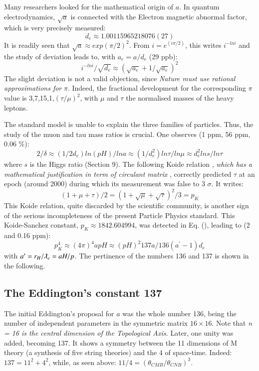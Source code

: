 \documentclass[twoside,draft]{article}
\begin{document}
\begin{sloppypar}
Many researchers looked for the mathematical origin of $a$. In quantum electrodynamics, $\sqrt{a}$ is connected with the Electron magnetic abnormal factor, which is very precisely measured\cite{Tanabashi}: $$d_e \approx 1.00115965218076(27)$$
It is readily seen that $\sqrt{a} \approx exp(\pi /2)^2$. From $i = e^{(i\pi /2)}$, this writes $i^{-lni}$ and the study of deviation leads to, with $a_e = a/d_e$ (29 ppb):
\begin{equation}
i^{-lni}/\sqrt{d_e} \approx (\sqrt{a_e} + 1/\sqrt{a_e})^2    
\end{equation}
The slight deviation is not a valid objection, since \textit{Nature must use rational approximations for} $\pi$. Indeed, the fractional development for the corresponding $\pi$ value is 3,7,15,1,$(\tau/\mu)^2$, with $\mu$ and $\tau$ the normalised masses of the heavy leptons.

The standard model is unable to explain the three families of particles. Thus, the study of the muon and tau mass ratios is crucial. One observes (1 ppm, 56 ppm, 0.06 \%):
\begin{equation}
2/\delta \approx (1/2d_{e}) ln(pH)/lna \approx (1/d_e^{2})ln\tau/ln\mu\approx d_e^2 lns/ln\tau
\end{equation}
where $s$ is the Higgs ratio (Section 9).
The following Koide relation \cite{Koide}, \textit{ which has a mathematical justification in term of circulant matrix} \cite{Brannen}, correctly predicted $\tau$ at an epoch (around 2000) during which its measurement was false to 3 $\sigma$. It writes:
\begin{equation}
(1 + \mu + \tau)/2 = (1 + \sqrt\mu + \sqrt\tau)^2/3 = p_K
\end{equation}
This Koide relation, quite discarded by the scientific community, is another sign of the serious incompleteness of the present Particle Physics standard.
This Koide-Sanchez constant, $p_K \approx 1842.604994$, was detected in Eq. (), leading to (2 and 0.16 ppm):
\begin{equation}
p_K^4 \approx (4\pi)^4 apH \approx (pH)^2 137a/136(a^{\prime}-1) d_e
\end{equation}
with $a^{\prime} = r_H/\lambdabar_e = aH/p$. The pertinence of the numbers 136 and 137 is shown in the following.


\subsection{The Eddington's constant 137}

The initial Eddington's proposal for $a$ was the whole number 136, being the number of independent parameters in the symmetric matrix $16 \times 16$. Note that \textit{n = 16 is the central dimension of the Topological Axis}. Later, one unity was added, becoming 137\cite{Eddington}. It shows a symmetry between the 11 dimensions of M theory (a synthesis of five string theories) and the 4 of space-time. Indeed: $137 = 11^{2} + 4^{2}$, while, as seen above: $11/4 = (\theta_{CMB}/\theta_{CNB})^{3}$.


\end{sloppypar}
\end{document}

